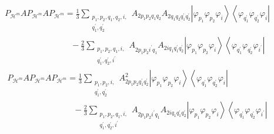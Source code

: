 \documentclass[aps,preprint]{revtex4}%
\begin{document}
\begin{align}
&  P_{\mathcal{H}^{m}}AP_{\mathcal{H}^{m}}AP_{\mathcal{H}^{m}}=\frac{1}{3}%
\sum_{\substack{p_{1},p_{2},q_{1},q_{2},i,\\q_{1}^{\prime},q_{2}^{\prime}%
}}A_{2p_{1}p_{2}q_{1}q_{2}}A_{2q_{1}q_{2}q_{1}^{\prime}q_{2}^{\prime}%
}\left\vert \varphi_{p_{1}}\varphi_{p_{2}}\varphi_{i}\right\rangle
\left\langle \varphi_{q_{1}^{\prime}}\varphi_{q_{2}^{\prime}}\varphi
_{i}\right\vert \\
&  \qquad\qquad\qquad\qquad-\frac{2}{3}\sum_{\substack{p_{1},p_{2}%
,q_{1},i,\\q_{1}^{\prime},q_{2}^{\prime},i^{\prime}}}A_{2p_{1}p_{2}i^{\prime
}q_{1}}A_{2iq_{1}q_{1}^{\prime}q_{2}^{\prime}}\left\vert \varphi_{p_{1}%
}\varphi_{p_{2}}\varphi_{i}\right\rangle \left\langle \varphi_{q_{1}^{\prime}%
}\varphi_{q_{2}^{\prime}}\varphi_{i^{\prime}}\right\vert
\end{align}%
\begin{align}
&  P_{\mathcal{H}^{m}}AP_{\mathcal{H}^{m}}AP_{\mathcal{H}^{m}}=\frac{1}{3}%
\sum_{\substack{p_{1},p_{2},i,\\q_{1}^{\prime},q_{2}^{\prime}}}A_{2p_{1}%
p_{2}q_{1}^{\prime}q_{2}^{\prime}}^{2}\left\vert \varphi_{p_{1}}\varphi
_{p_{2}}\varphi_{i}\right\rangle \left\langle \varphi_{q_{1}^{\prime}}%
\varphi_{q_{2}^{\prime}}\varphi_{i}\right\vert \\
&  \qquad\qquad\qquad\qquad-\frac{2}{3}\sum_{\substack{p_{1},p_{2}%
,q_{1},i,\\q_{1}^{\prime},q_{2}^{\prime},i^{\prime}}}A_{2p_{1}p_{2}i^{\prime
}q_{1}}A_{2iq_{1}q_{1}^{\prime}q_{2}^{\prime}}\left\vert \varphi_{p_{1}%
}\varphi_{p_{2}}\varphi_{i}\right\rangle \left\langle \varphi_{q_{1}^{\prime}%
}\varphi_{q_{2}^{\prime}}\varphi_{i^{\prime}}\right\vert
\end{align}
\end{document}
